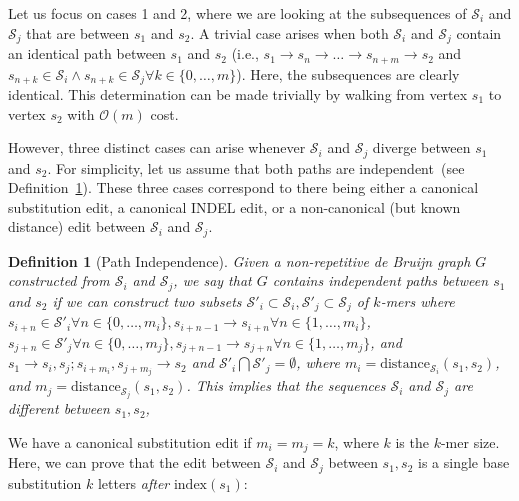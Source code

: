\documentclass[masters]{ucbthesis}
\newtheorem{defn}{Definition}
\begin{document}
Let us focus on cases 1 and 2, where we are looking at the subsequences of $\mathcal{S}_i$ and
$\mathcal{S}_j$ that are between $s_1$ and $s_2$. A trivial case arises when both $\mathcal{S}_i$ and
$\mathcal{S}_j$ contain an identical path between $s_1$ and $s_2$ (i.e.,
$s_1 \rightarrow s_n \rightarrow \dots \rightarrow s_{n + m} \rightarrow s_2$ and
$s_{n + k} \in \mathcal{S}_i \wedge s_{n + k} \in \mathcal{S}_j \forall k \in \{0, \dots , m\}$). Here, the
subsequences are clearly identical. This determination can be made trivially by walking from vertex $s_1$
to vertex $s_2$ with $\mathcal{O}(m)$ cost.

However, three distinct cases can arise whenever $\mathcal{S}_i$ and $\mathcal{S}_j$ diverge between
$s_1$ and $s_2$. For simplicity, let us assume that both paths are independent~(see
Definition~\ref{defn:path-independence}). These three cases correspond to there being either a canonical
substitution edit, a canonical INDEL edit, or a non-canonical (but known distance) edit between
$\mathcal{S}_i$ and $\mathcal{S}_j$.

\begin{defn}[Path Independence]
\label{defn:path-independence}
Given a non-repetitive \emph{de Bruijn} graph $G$ constructed from $\mathcal{S}_i$ and $\mathcal{S}_j$, we say
that $G$ contains independent paths between $s_1$ and $s_2$ if we can construct two subsets
$\mathcal{S}'_i \subset \mathcal{S}_i, \mathcal{S}'_j \subset \mathcal{S}_j$ of $k$-mers where $s_{i + n}
\in \mathcal{S}'_i \forall n \in \{0, \dots, m_i\}, s_{i + n - 1} \rightarrow s_{i + n} \forall n \in \{1, \dots, m_i\}$,
$s_{j + n} \in \mathcal{S}'_j \forall n \in \{0, \dots, m_j\}, s_{j + n - 1} \rightarrow s_{j + n} \forall n \in \{1,
\dots, m_j\}$, and $s_1 \rightarrow s_i, s_j; s_{i + m_i}, s_{j + m_j} \rightarrow s_2$ and $\mathcal{S}'_i
\bigcap \mathcal{S}'_j = \emptyset$, where $m_i = \text{distance}_{\mathcal{S}_i}(s_1, s_2)$, and $m_j =
\text{distance}_{\mathcal{S}_j}(s_1, s_2)$. This implies that the sequences $\mathcal{S}_i$ and
$\mathcal{S}_j$ are different between $s_1, s_2$,
\end{defn}

We have a canonical substitution edit if $m_i = m_j = k$, where $k$ is the $k$-mer size. Here, we can
prove that the edit between $\mathcal{S}_i$ and $\mathcal{S}_j$ between $s_1, s_2$ is a single base
substitution $k$ letters \emph{after} $\text{index}(s_1)$:
\end{document}
